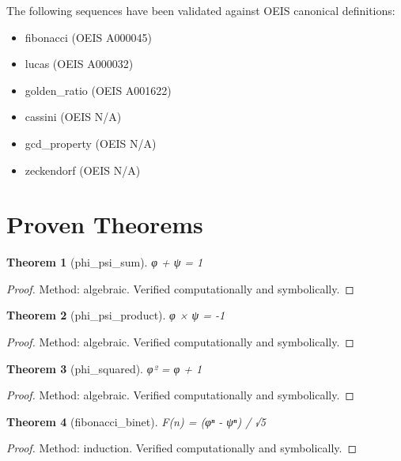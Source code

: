 \documentclass{article}
\newtheorem{theorem}{Theorem}
\begin{document}
The following sequences have been validated against OEIS canonical definitions:

\begin{itemize}
    \item [\checkmark] fibonacci (OEIS A000045)
    \item [\checkmark] lucas (OEIS A000032)
    \item [\checkmark] golden_ratio (OEIS A001622)
    \item [\checkmark] cassini (OEIS N/A)
    \item [\checkmark] gcd_property (OEIS N/A)
    \item [\checkmark] zeckendorf (OEIS N/A)

\end{itemize}

\section{Proven Theorems}

\begin{theorem}[phi_psi_sum]
φ + ψ = 1
\end{theorem}

\begin{proof}
Method: algebraic. Verified computationally and symbolically.
\end{proof}

\begin{theorem}[phi_psi_product]
φ × ψ = -1
\end{theorem}

\begin{proof}
Method: algebraic. Verified computationally and symbolically.
\end{proof}

\begin{theorem}[phi_squared]
φ² = φ + 1
\end{theorem}

\begin{proof}
Method: algebraic. Verified computationally and symbolically.
\end{proof}

\begin{theorem}[fibonacci_binet]
F(n) = (φⁿ - ψⁿ) / √5
\end{theorem}

\begin{proof}
Method: induction. Verified computationally and symbolically.
\end{proof}
\end{document}
